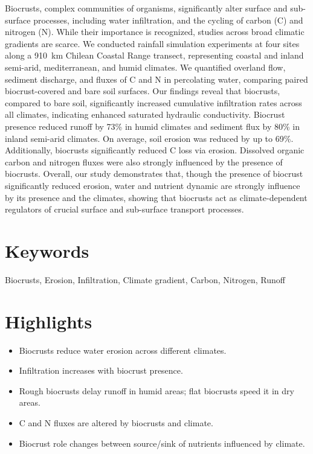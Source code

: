 Biocrusts, complex communities of organisms, significantly alter surface and sub-surface processes, including water infiltration, and the cycling of carbon (C) and nitrogen (N). While their importance is recognized, studies across broad climatic gradients are scarce. We conducted rainfall simulation experiments at four sites along a \SI{910}{\kilo\meter} Chilean Coastal Range transect, representing coastal and inland semi-arid, mediterranean, and humid climates. We quantified overland flow, sediment discharge, and fluxes of C and N in percolating water, comparing paired biocrust-covered and bare soil surfaces. Our findings reveal that biocrusts, compared to bare soil, significantly increased cumulative infiltration rates across all climates, indicating enhanced saturated hydraulic conductivity. Biocrust presence reduced runoff by 73\% in humid climates and sediment flux by 80\% in inland semi-arid climates. On average, soil erosion was reduced by up to 69\%. Additionally, biocrusts significantly reduced C loss via erosion. Dissolved organic carbon and nitrogen fluxes were also strongly influenced by the presence of biocrusts. Overall, our study demonstrates that, though the presence of biocrust significantly reduced erosion, water and nutrient dynamic are strongly influence by its presence and the climates, showing that biocrusts act as climate-dependent regulators of crucial surface and sub-surface transport processes.

\section*{Keywords}

Biocrusts, Erosion, Infiltration, Climate gradient, Carbon, Nitrogen, Runoff

\section*{Highlights}

\begin{itemize}
  \item Biocrusts reduce water erosion across different climates.
  \item Infiltration increases with biocrust presence.
  \item Rough biocrusts delay runoff in humid areas; flat biocrusts speed it in dry areas.
  \item C and N fluxes are altered by biocrusts and climate.
  \item Biocrust role changes between source/sink of nutrients influenced by climate.
\end{itemize}

